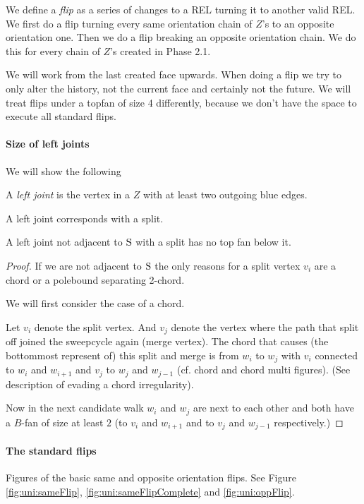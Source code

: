     We define a \emph{flip} as a series of changes to a REL turning it to another valid REL.
    We first do a flip turning every same orientation chain of $Z$'s to an opposite orientation one. Then we do a flip breaking an opposite orientation chain. We do this for every chain of $Z$'s created in Phase 2.1.

  We will work from the last created face upwards. When doing a flip we try to only alter the history, not the current face and certainly not the future. We will treat flips under a topfan of size 4 differently, because we don't have the space to execute all standard flips.

  \paragraph{Size of left joints}
  We will show the following

  \begin{defi}
    A \emph{left joint} is the vertex in a $Z$ with at least two outgoing blue edges.
  \end{defi}

  A left joint corresponds with a split.

  \begin{lemma}
    \label{lm:}
    A left joint not adjacent to $\mathrm{S}$ with a split has no top fan below it.
  \end{lemma}
  \begin{proof}
    If we are not adjacent to $\mathrm{S}$ the only reasons for a split vertex $v_i$ are a chord or a polebound separating 2-chord.

    We will first consider the case of a chord.

    Let $v_i$ denote the split vertex. And $v_j$ denote the vertex where the path that split off joined the sweepcycle again (merge vertex). The chord that causes (the bottommost represent of) this split and merge is from $w_i$ to $w_j$ with $v_i$ connected to $w_i$ and $w_{i+1}$ and $v_j$ to $w_j$ and $w_{j-1}$ (cf. chord and chord multi figures). (See description of evading a chord irregularity).

    Now in the next candidate walk $w_i$ and $w_j$ are next to each other and both have a $B$-fan of size at least $2$ (to $v_i$ and $w_{i+1}$ and to $v_j$ and $w_{j-1}$ respectively.)

  \end{proof}

  \paragraph{The standard flips}
  Figures of the basic same and opposite orientation flips.
   See Figure \ref{fig:uni:sameFlip}, \ref{fig:uni:sameFlipComplete} and \ref{fig:uni:oppFlip}.

